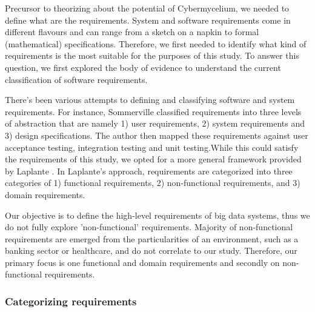 \documentclass[review]{elsarticle}
\begin{document}
Precursor to theorizing about the potential of Cybermycelium, we needed to define what are the requirements. System and software requirements come in different flavours and can range from a sketch on a napkin to formal (mathematical) specifications. Therefore, we first needed to identify what kind of requirements is the most suitable for the purposes of this study. To answer this question, we first explored the body of evidence to understand the current classification of software requirements. 

There's been various attempts to defining and classifying software and system requirements. For instance, Sommerville \cite{sommerville2011software} classified requirements into three levels of abstraction that are namely 1) user requirements, 2) system requirements and 3) design specifications. The author then mapped these requirements against user acceptance testing, integration testing and unit testing.While this could satisfy the requirements of this study, we opted for a more general framework provided by Laplante \cite{laplante2017requirements}. In Laplante's approach, requirements are categorized into three categories of 1) functional requirements, 2) non-functional requirements, and 3) domain requirements. 

Our objective is to define the high-level requirements of big data systems, thus we do not fully explore 'non-functional' requirements. Majority of non-functional requirements are emerged from the particularities of an environment, such as a banking sector or healthcare, and do not correlate to our study. Therefore, our primary focus is one functional and domain requirements and secondly on non-functional requirements.

\subsubsection{Categorizing requirements} 
\end{document}
